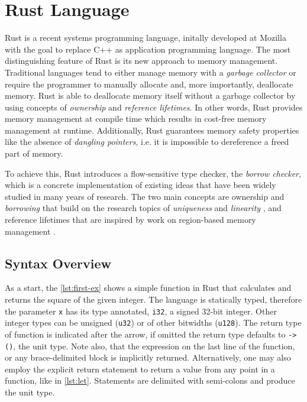 \section{Rust Language}

Rust \cite{rust2, rust1} is a recent systems programming language, initally
developed at Mozilla with the goal to replace C++ as application programming
language. The most distinguishing feature of Rust is its new approach to memory
management. Traditional languages tend to either manage memory with a
\emph{garbage collector} or require the programmer to manually allocate and,
more importantly, deallocate memory. Rust is able to deallocate memory itself
without a garbage collector by using concepts of \emph{ownership} and
\emph{reference lifetimes}. In other words, Rust provides memory management at
compile time which results in cost-free memory management at runtime.
Additionally, Rust guarantees memory safety properties like  the absence of
\emph{dangling pointers}, i.e. it is impossible to dereference a freed part of
memory.

To achieve this, Rust introduces a flow-sensitive type checker, the \emph{borrow
checker}, which is a concrete implementation of existing ideas that have been
widely studied in many years of research. The two main concepts are ownership
\cite{ownership-types} and \emph{borrowing} that build on the research topics of
\emph{uniqueness} \cite{external-uniqueness, alias-burying} and \emph{linearity}
\cite{Wadler90lineartypes, once-upon-a-type, linear-haskell}, and reference
lifetimes that are inspired by work on region-based memory management
\cite{cyclone-region}.


\subsection{Syntax Overview}

As a start, the \autoref{lst:first-ex} shows a simple function in Rust that
calculates and returns the square of the given integer. The language is
statically typed, therefore the parameter \lstinline!x! has its type annotated,
\lstinline!i32!, a signed 32-bit integer. Other integer types can be unsigned
(\lstinline!u32!) or of other bitwidths (\lstinline!u128!). The return type of
function is indicated after the arrow, if omitted the return type defaults to
\lstinline!-> ()!, the unit type. Note also, that the expression on the last
line of the function, or any brace-delimited block is implicitly returned.
Alternatively, one may also employ the explicit return statement to return a
value from any point in a function, like in \autoref{lst:let}. Statements
are delimited with semi-colons and produce the unit type.

